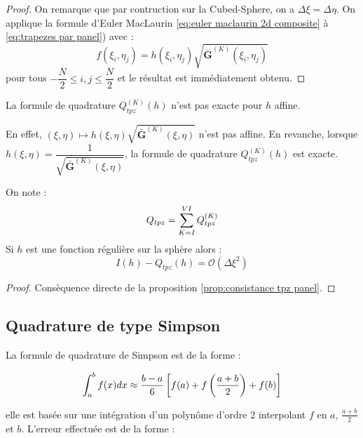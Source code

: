 \begin{proof}
On remarque que par contruction sur la Cubed-Sphere, on a $\Delta \xi = \Delta \eta$.
On applique la formule d'Euler MacLaurin \eqref{eq:euler maclaurin 2d composite} à \eqref{eq:trapezes par panel}) avec :
\begin{equation}
f(\xi_i,\eta_j) = h(\xi_i, \eta_j) \sqrt{\mathbf{\bar{G}}^{(K)}(\xi_i, \eta_j)} 
\end{equation}
pour tous $-\dfrac{N}{2} \leq i,j \leq \dfrac{N}{2}$ et le résultat est immédiatement obtenu.
\end{proof}

\begin{remarque}
La formule de quadrature $Q_{tpz}^{(K)}(h)$ n'est pas exacte pour $h$ affine.

En effet, $(\xi,\eta) \mapsto h(\xi, \eta) \sqrt{\mathbf{\bar{G}}^{(K)}(\xi, \eta)}$ n'est pas affine.
En revanche, lorsque $h(\xi,\eta)=\dfrac{1}{\sqrt{\mathbf{\bar{G}}^{(K)}(\xi, \eta)}}$, la formule de quadrature $Q_{tpz}^{(K)}(h)$ est exacte.
\end{remarque}

\begin{proposition}
On note :
\begin{equation}
Q_{tpz}=\displaystyle\sum\limits_{K=I}^{VI} Q_{tpz}^{(K)}
\end{equation}
Si $h$ est une fonction régulière sur la sphère alors :
\begin{equation}
I(h) - Q_{tpz}(h) = \mathcal{O} \left( \Delta \xi^2 \right)
\end{equation}
\label{prop:consistance tpz}
\end{proposition}

\begin{proof}
Consèquence directe de la proposition \ref{prop:consistance tpz panel}.
\end{proof}




\subsection{Quadrature de type Simpson}

La formule de quadrature de Simpson est de la forme :

\begin{equation}
\displaystyle\int_a^b f(x)dx \approx \dfrac{b-a}{6} \left[ f(a)+f\left(\dfrac{a+b}{2}\right) + f(b) \right]
\end{equation}

elle est basée sur une intégration d'un polynôme d'ordre 2 interpolant $f$ en $a$, $\frac{a+b}{2}$ et $b$.
L'erreur effectuée est de la forme :

